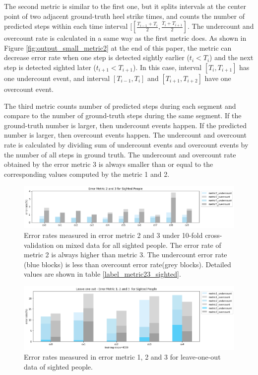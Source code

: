 \documentclass[11pt]{article}
\begin{document}
{The second metric is similar to the first one,  but it  splits intervals at the center point of two adjacent ground-truth heel strike times, and counts the number of predicted steps within each time interval $[[\frac{T_{i-1}+T_i}{2}, \frac{T_i+T_{i+1}}{2}]$. The undercount and overcount rate is calculated in a same way as the first metric does. As shown in Figure \ref{fig:output_small_metric2} at the end of this paper,  the metric can decrease error rate when one step is detected sightly earlier ($t_i<T_i$) and the next step is detected sighted later ($t_{i+1}<T_{i+1}$). In this case, interval $[T_i, T_{i+1}]$ has one undercount event, and interval $[T_{i-1}, T_i]$ and $[T_{i+1}, T_{i+2}]$ have one overcount event.

The third metric counts number of predicted steps during each segment and compare to the number of ground-truth steps during the same segment. If the ground-truth number is larger, then undercount events happen. If the predicted number is larger, then overcount events happen. The undercount and overcount rate is calculated by dividing sum of undercount events and overcount events by the number of all steps in ground truth. The undercount and overcount rate obtained by the error metric 3 is always smaller than or equal to the corresponding values computed by the metric 1 and 2.

\begin{figure}[ht]
\centering
\includegraphics[scale=0.5]{error_metric_23_na_10fold}
\caption{Error rates measured in error metric 2 and 3 under 10-fold cross-validation on mixed data for all sighted people. The error rate of metric 2 is always higher than metric 3. The undercount error rate (blue blocks) is less than overcount error rate(grey blocks). Detailed values are shown in table \ref{label_metric23_sighted}.}
\label{fig:error_metric_23_na_10fold}
\end{figure}

\begin{figure}[ht]
\centering
\includegraphics[scale=0.5]{error_metric_123_na_5fold}
\caption{Error rates measured in error metric 1, 2 and 3 for leave-one-out data of sighted people.}
\label{fig:error_metric_123_na_5fold}
\end{figure}


}
\end{document}

